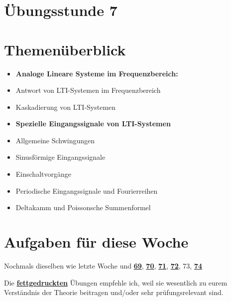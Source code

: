 \documentclass[11pt]{article}
\begin{document}
\thispagestyle{firstpage}

\setlength{\headheight}{1 \baselineskip}  %
\setlength{\parindent}{0pt}  %
\setlength{\parskip}{\baselineskip}  %

\vspace*{-5px}
\section*{Übungsstunde 7}

\section*{Themenüberblick}
\begin{itemize}
    \item \textbf{Analoge Lineare Systeme im Frequenzbereich:}
    \item[] Antwort von LTI-Systemen im Frequenzbereich
    \item[] Kaskadierung von LTI-Systemen
    \item \textbf{Spezielle Eingangssignale von LTI-Systemen}
    \item[] Allgemeine Schwingungen
    \item[] Sinusförmige Eingangssignale 
    \item[] Einschaltvorgänge
    \item[] Periodische Eingangssignale und Fourierreihen
    \item[] Deltakamm und Poissonsche Summenformel
\end{itemize}

\section*{Aufgaben für diese Woche}
\vspace{-0.5cm}

Nochmals dieselben wie letzte Woche und \underline{\textbf{69}}, \underline{\textbf{70}}, \underline{\textbf{71}}, \underline{\textbf{72}}, 73, \underline{\textbf{74}}\\
\vspace{-0.5cm}

Die \underline{\textbf{fettgedruckten}} Übungen empfehle ich, weil sie wesentlich zu eurem Verständnis der Theorie beitragen und/oder sehr prüfungsrelevant sind.

\vfill \null
\pagebreak
\end{document}
